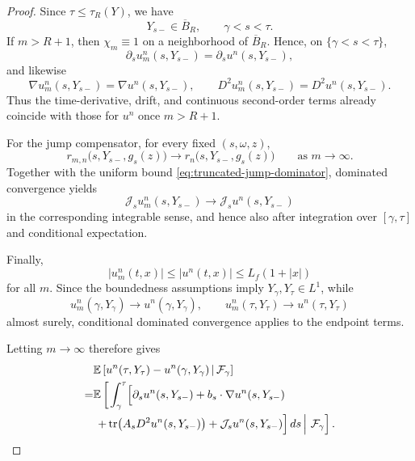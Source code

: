 \documentclass[12pt,oneside, reqno]{amsart}
\numberwithin{equation}{section}
\begin{document}
\begin{proof}
Since \(\tau\leq\tau_R(Y)\), we have
\[
Y_{s-}\in\overline B_R,
\qquad
\gamma<s<\tau.
\]
If \(m>R+1\), then \(\chi_m\equiv1\) on a neighborhood of
\(\overline B_R\). Hence, on \(\{\gamma<s<\tau\}\),
\[
\partial_su_m^n(s,Y_{s-})
=
\partial_su^n(s,Y_{s-}),
\]
and likewise
\[
\nabla u_m^n(s,Y_{s-})
=
\nabla u^n(s,Y_{s-}),
\qquad
D^2u_m^n(s,Y_{s-})
=
D^2u^n(s,Y_{s-}).
\]
Thus the time-derivative, drift, and continuous second-order terms
already coincide with those for \(u^n\) once \(m>R+1\).

For the jump compensator, for every fixed \((s,\omega,z)\),
\[
r_{m,n}\bigl(s,Y_{s-},g_s(z)\bigr)
\longrightarrow
r_n\bigl(s,Y_{s-},g_s(z)\bigr)
\qquad\text{as }m\to\infty.
\]
Together with the uniform bound
\eqref{eq:truncated-jump-dominator}, dominated convergence yields
\[
\mathcal J_su_m^n(s,Y_{s-})
\longrightarrow
\mathcal J_su^n(s,Y_{s-})
\]
in the corresponding integrable sense, and hence also after integration
over \([\gamma,\tau]\) and conditional expectation.

Finally,
\[
|u_m^n(t,x)|
\leq
|u^n(t,x)|
\leq
L_f(1+|x|)
\]
for all \(m\). Since the boundedness assumptions imply
\(Y_\gamma,Y_\tau\in L^1\), while
\[
u_m^n(\gamma,Y_\gamma)\to u^n(\gamma,Y_\gamma),
\qquad
u_m^n(\tau,Y_\tau)\to u^n(\tau,Y_\tau)
\]
almost surely, conditional dominated convergence applies to the endpoint
terms.

Letting \(m\to\infty\) therefore gives
\begin{equation}
	\label{eq:ito-formula-krylov-revised}
	\begin{aligned}
		&\mathbb E\left[
		u^n(\tau,Y_\tau)
		-u^n(\gamma,Y_\gamma)
		\,\middle|\,
		\mathcal F_\gamma
		\right]
		\\
		=&
		\mathbb E\left[
		\left.
		\int_\gamma^\tau
		\Bigl[
		\partial_su^n(s,Y_{s-})
		+b_s\cdot\nabla u^n(s,Y_{s-})
		\right.\right.
		\\
		&\left.\left.
		+\operatorname{tr}\!\left(
		A_sD^2u^n(s,Y_{s-})
		\right)
		+\mathcal J_su^n(s,Y_{s-})
		\Bigr]\,ds
		\,\right|\,
		\mathcal F_\gamma
		\right].
	\end{aligned}
\end{equation}


\end{proof}
\end{document}
